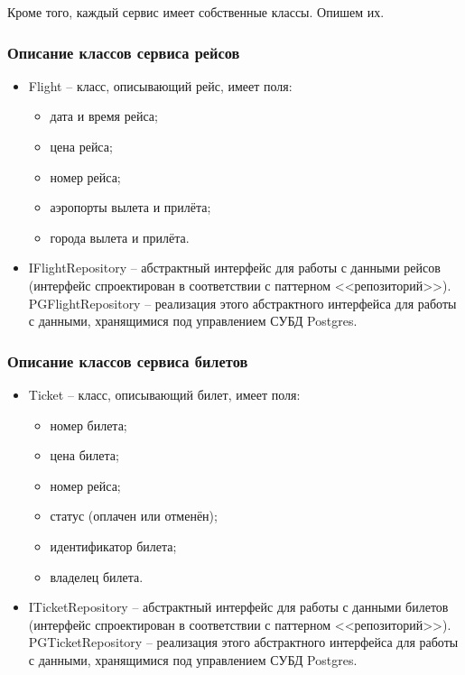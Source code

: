 Кроме того, каждый сервис имеет собственные классы. Опишем их.

\subsubsection{Описание классов сервиса рейсов}

\begin{itemize}
    \item Flight -- класс, описывающий рейс, имеет поля:
    \begin{itemize}
        \item дата и время рейса;
        \item цена рейса;
        \item номер рейса;
        \item аэропорты вылета и прилёта;
        \item города вылета и прилёта.
    \end{itemize}
    \item IFlightRepository -- абстрактный интерфейс для работы с данными рейсов (интерфейс спроектирован в соответствии с паттерном <<репозиторий>>). PGFlightRepository -- реализация этого абстрактного интерфейса для работы с данными, хранящимися под управлением СУБД Postgres.
\end{itemize}

\subsubsection{Описание классов сервиса билетов}

\begin{itemize}
    \item Ticket -- класс, описывающий билет, имеет поля:
    \begin{itemize}
        \item номер билета;
        \item цена билета;
        \item номер рейса;
        \item статус (оплачен или отменён);
        \item идентификатор билета;
        \item владелец билета.
    \end{itemize}
    \item ITicketRepository -- абстрактный интерфейс для работы с данными билетов (интерфейс спроектирован в соответствии с паттерном <<репозиторий>>). PGTicketRepository -- реализация этого абстрактного интерфейса для работы с данными, хранящимися под управлением СУБД Postgres.
\end{itemize}

